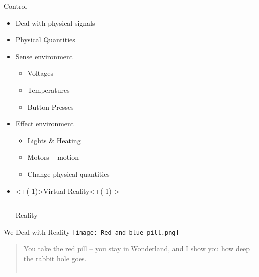 \documentclass[xcolor=svgnames]{beamer}
\begin{document}
\newcommand\redout{\bgroup\markoverwith
{\textcolor{red}{\rule[0.3ex]{2pt}{2pt}}}\ULon}
\begin{frame}{Control}
    \begin{itemize}[<+->]
        \item Deal with physical signals
        \item Physical Quantities
        \item Sense environment
        \begin{itemize}
          \item Voltages
          \item Temperatures
          \item Button Presses
        \end{itemize}
        \item Effect environment
        \begin{itemize}
            \item Lights \& Heating
            \item Motors -- motion
            \item Change physical quantities
        \end{itemize}
        \item \only<+(-1)>{Virtual Reality}\only<+(-1)->{\redout{Virtual} Reality}
    \end{itemize}
\end{frame}

\begin{frame}{We Deal with Reality}
    \texttt{[image: Red\_and\_blue\_pill.png]}\\
    \pause
    \begin{quote}
        You take the red pill -- you stay in Wonderland, and I show you how deep the rabbit hole goes.\\
        ~\hspace*{\fill}{\textit Morpheus, The Matrix}
    \end{quote}
\end{frame}
\end{document}
